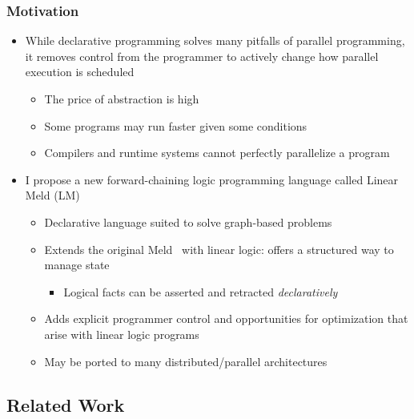 \documentclass{beamer}
\begin{document}
\begin{frame}[fragile]
   \frametitle{Motivation}
   \begin{itemize}
      \item While declarative programming solves many pitfalls of parallel programming, it removes control from the programmer to actively change how parallel execution is scheduled
      \begin{itemize}
         \item The price of abstraction is high
         \item Some programs may run faster given some conditions
         \item Compilers and runtime systems cannot perfectly parallelize a program
      \end{itemize}
      \item I propose a new forward-chaining logic programming language called Linear Meld (LM)
      \begin{itemize}
         \item Declarative language suited to solve graph-based problems
         \item Extends the original Meld~\cite{ashley-rollman-iclp09} with linear logic: offers a structured way to manage state
         \begin{itemize}
            \item Logical facts can be asserted and retracted \emph{declaratively}
         \end{itemize}
         \item Adds explicit programmer control and opportunities for optimization that arise with linear logic programs
         \item May be ported to many distributed/parallel architectures
      \end{itemize}
   \end{itemize}
\end{frame}

\subsection{Related Work}
\end{document}
